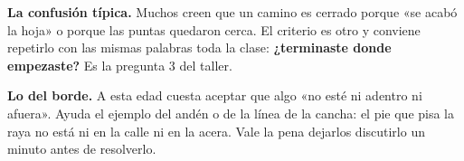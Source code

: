 \documentclass[11pt]{article}
\begin{document}
\begin{nota}
\textbf{La confusión típica.} Muchos creen que un camino es cerrado porque «se acabó la hoja»
o porque las puntas quedaron cerca. El criterio es otro y conviene repetirlo con las mismas
palabras toda la clase: \textbf{¿terminaste donde empezaste?} Es la pregunta 3 del taller.
\end{nota}

\begin{nota}
\textbf{Lo del borde.} A esta edad cuesta aceptar que algo «no esté ni adentro ni afuera».
Ayuda el ejemplo del andén o de la línea de la cancha: el pie que pisa la raya no está ni en la
calle ni en la acera. Vale la pena dejarlos discutirlo un minuto antes de resolverlo.
\end{nota}
\end{document}
